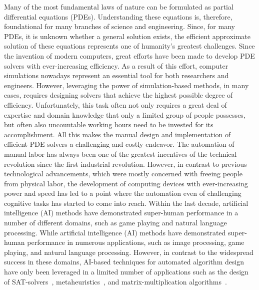 Many of the most fundamental laws of nature can be formulated as partial differential equations (PDEs).
Understanding these equations is, therefore, foundational for many branches of science and engineering.
Since, for many PDEs, it is unknown whether a general solution exists, the efficient approximate solution of these equations represents one of humanity's greatest challenges.
Since the invention of modern computers, great efforts have been made to develop PDE solvers with ever-increasing efficiency.
As a result of this effort, computer simulations nowadays represent an essential tool for both researchers and engineers.
However, leveraging the power of simulation-based methods, in many cases, requires designing solvers that achieve the highest possible degree of efficiency.
Unfortunately, this task often not only requires a great deal of expertise and domain knowledge that only a limited group of people possesses, but often also uncountable working hours need to be invested for its accomplishment.
All this makes the manual design and implementation of efficient PDE solvers a challenging and costly endeavor.
The automation of manual labor has always been one of the greatest incentives of the technical revolution since the first industrial revolution.
However, in contrast to previous technological advancements, which were mostly concerned with freeing people from physical labor, the development of computing devices with ever-increasing power and speed has led to a point where the automation even of challenging cognitive tasks has started to come into reach.
Within the last decade, artificial intelligence (AI) methods have demonstrated super-human performance in a number of different domains, such as game playing and natural language processing.
While artificial intelligence (AI) methods have demonstrated super-human performance in numerous applications, such as image processing, game playing, and natural language processing.
However, in contrast to the widespread success in these domains, AI-based techniques for automated algorithm design have only been leveraged in a limited number of applications such as the design of SAT-solvers~\cite{khudabukhsh2016satenstein}, metaheuristics~\cite{stuetzle2019automated}, and matrix-multiplication algorithms~\cite{fawzi2022discovering}.
